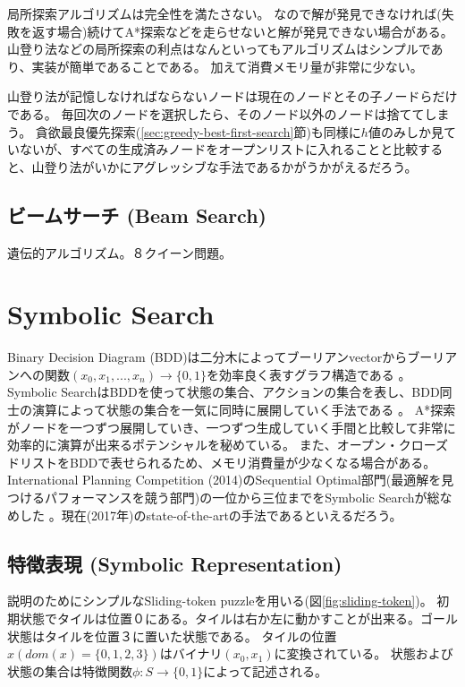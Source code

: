 \documentclass[10pt]{book}
\begin{document}
局所探索アルゴリズムは完全性を満たさない。
なので解が発見できなければ(失敗を返す場合)続けてA*探索などを走らせないと解が発見できない場合がある。
山登り法などの局所探索の利点はなんといってもアルゴリズムはシンプルであり、実装が簡単であることである。
加えて消費メモリ量が非常に少ない。

山登り法が記憶しなければならないノードは現在のノードとその子ノードらだけである。
毎回次のノードを選択したら、そのノード以外のノードは捨ててしまう。
貪欲最良優先探索(\ref{sec:greedy-best-first-search}節)も同様に$h$値のみしか見ていないが、すべての生成済みノードをオープンリストに入れることと比較すると、山登り法がいかにアグレッシブな手法であるかがうかがえるだろう。


\subsection{ビームサーチ (Beam Search)}



遺伝的アルゴリズム。８クイーン問題。


\section{Symbolic Search}
\label{sec:symbolic-search}
Binary Decision Diagram (BDD)は二分木によってブーリアンvectorからブーリアンへの関数$(x_0,x_1,...,x_n) \rightarrow \{0, 1\}$を効率良く表すグラフ構造である \cite{}。
Symbolic SearchはBDDを使って状態の集合、アクションの集合を表し、BDD同士の演算によって状態の集合を一気に同時に展開していく手法である \cite{}。
A*探索がノードを一つずつ展開していき、一つずつ生成していく手間と比較して非常に効率的に演算が出来るポテンシャルを秘めている。
また、オープン・クローズドリストをBDDで表せられるため、メモリ消費量が少なくなる場合がある。
International Planning Competition (2014)のSequential Optimal部門(最適解を見つけるパフォーマンスを競う部門)の一位から三位までをSymbolic Searchが総なめした \cite{}。現在(2017年)のstate-of-the-artの手法であるといえるだろう。


\subsection{特徴表現 (Symbolic Representation)}
\label{sec:symbolic-representation}

説明のためにシンプルなSliding-token puzzleを用いる(図\ref{fig:sliding-token})。
初期状態でタイルは位置０にある。タイルは右か左に動かすことが出来る。ゴール状態はタイルを位置３に置いた状態である。
タイルの位置$x (dom(x) = \{0,1,2,3\})$はバイナリ$(x_0,x_1)$に変換されている。
状態および状態の集合は特徴関数$\phi: S \rightarrow \{0, 1\}$によって記述される。
\end{document}
